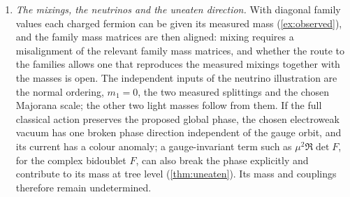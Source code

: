 \begin{enumerate}[leftmargin=2em,itemsep=4pt]
Model does, which leaves the number three unexplained.
\item \emph{The mixings, the neutrinos and the uneaten direction.} With diagonal family values each charged fermion can be given its measured
mass (\cref{ex:observed}), and the family mass matrices are then aligned: mixing requires a misalignment of the relevant family mass matrices,
and whether the route to the families allows one that reproduces the measured mixings together with the masses is open. The independent
inputs of the neutrino illustration are the normal ordering, $m_1=0$, the two measured splittings and the chosen Majorana scale; the other two
light masses follow from them. If the full classical action preserves the proposed global phase, the
chosen electroweak vacuum has one broken phase direction independent of the gauge orbit, and its current has a colour anomaly; a
gauge-invariant term such as $\mu^2\Re\det F$, for the complex bidoublet $F$, can also break the phase explicitly and contribute to its mass
at tree level (\cref{thm:uneaten}). Its mass and couplings therefore remain undetermined.
\end{enumerate}
